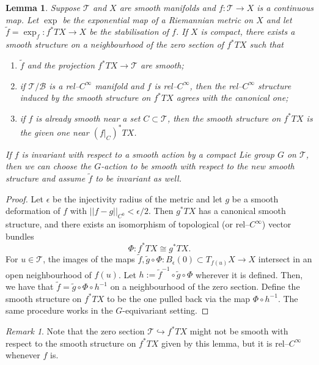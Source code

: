 \documentclass[11pt,psamsfonts, oneside, reqno]{amsart}
\newcommand{\cl}{\colon}
\newcommand{\cB}{\mathcal{B}}
\newcommand{\cT}{\mathcal{T}}
\newcommand{\wt}{\widetilde}
\newtheorem{lemma}[theorem]{Lemma}
\theoremstyle{definition}
\theoremstyle{remark}
\newtheorem{remark}[theorem]{Remark}
\numberwithin{equation}{section}
\begin{document}
\begin{lemma}
	\label{lem:smoothing-maps}
	Suppose $\cT$ and $X$ are smooth manifolds and $f\cl \cT \rightarrow X$ is a continuous map. Let $\exp$ be the exponential map of a Riemannian metric on $X$ and let $\wt f = \exp_{f}\cl  f^*TX \rightarrow X$ be the stabilisation of $f$. If $X$ is compact, there exists a smooth structure on a neighbourhood of the zero section of $f^*TX$ such that 
	\begin{enumerate}[label=\normalfont \arabic*),leftmargin=20pt,ref=\arabic*]
		\item $\wt f$ and the projection $f^*TX \rightarrow \cT$ are smooth;
		\item if $\cT/\cB$ is a rel--$C^\infty$ manifold and $f$ is rel--$C^\infty$, then the rel--$C^\infty$ structure induced by the smooth structure on $f^*TX$ agrees with the canonical one;
		\item if $f$ is already smooth near a set $C \subset \cT$, then the smooth structure on $f^*TX$ is the given one near $(f|_C)^*TX$.
	\end{enumerate}
	If $f$ is invariant with respect to a smooth action by a compact Lie group $G$ on $\cT$, then we can choose the $G$-action to be smooth with respect to the new smooth structure and assume $\wt f$ to be invariant as well.
\end{lemma}
\begin{proof}
	Let $\epsilon$ be the injectivity radius of the metric and let $g$ be a smooth deformation of $f$ with $||f-g||_{C^0} < \epsilon/2$. Then $g^*TX$ has a canonical smooth structure, and there exists an isomorphism of topological (or rel--$C^\infty$) vector bundles \[
	\Phi\cl f^*TX \cong g^*TX.
	\]
	For $u \in \cT$, the images of the maps $\wt f, \wt g \circ \Phi\cl  B_\epsilon(0) \subset T_{f(u)}X \rightarrow X$ intersect in an open neighbourhood of $f(u)$. Let $h := \wt f^{-1} \circ \wt g \circ \Phi$ wherever it is defined. Then, we have that $\wt f = \wt g \circ \Phi \circ h^{-1}$ on a neighbourhood of the zero section. Define the smooth structure on $f^*TX$ to be the one pulled back via the map $\Phi \circ h^{-1}$. The same procedure works in the $G$-equivariant setting.
\end{proof}

\begin{remark}\label{} 
	Note that the zero section $\cT \hookrightarrow f^*TX$ might not be smooth with respect to the smooth structure on $f^*TX$ given by this lemma, but it is rel--$C^\infty$ whenever $f$ is.
\end{remark}
\end{document}
